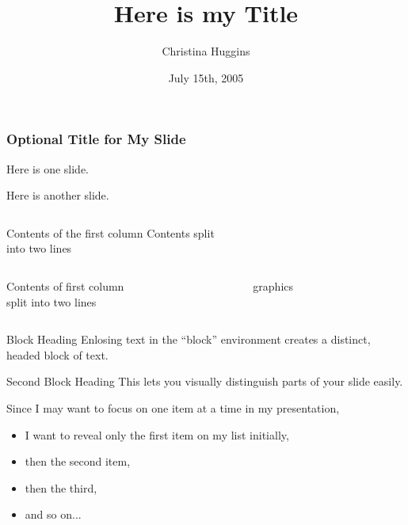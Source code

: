 \documentclass{beamer}
\title{Here is my Title}
\author{Christina Huggins}
\date{July 15th, 2005}
\begin{document}
\begin{frame}
\frametitle{Optional Title for My Slide}
Here is one slide.
\end{frame}

\begin{frame}
Here is another slide.
\end{frame}

\begin{frame}
\begin{columns}[c] %
Contents of the first column
Contents split \\ into two lines
\end{columns}
\end{frame}

\begin{frame}
\begin{columns}[t] %
\begin{column}{5cm} %
Contents of first column \\ split into two lines
\end{column}
\begin{column}[T]{5cm} %
graphics %
\end{column}
\end{columns}
\end{frame} 

\begin{frame}
\begin{block}{Block Heading}
Enlosing text in the ``block'' environment creates a distinct, headed block of text.
\end{block}
\begin{block}{Second Block Heading}
This lets you visually distinguish parts of your slide easily.
\end{block}
\end{frame}

\begin{frame}
Since I may want to focus on one item at a time in my presentation,
\begin{itemize}
\item I want to reveal only the first item on my list initially,
\pause
\item then the second item,
\pause
\item then the third,
\pause
\item and so on...
\end{itemize}
\end{frame}
\end{document}
